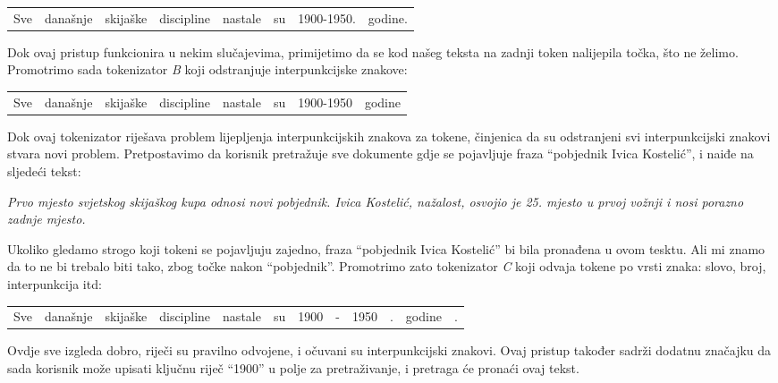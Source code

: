 \documentclass[a4paper,twoside,12pt]{scrreprt}
\newenvironment{nscenter}
 {\par\nopagebreak\centering}
 {\parskip=0pt\par\noindent\ignorespacesafterend}
\begin{document}
\begin{nscenter}
  \begin{tabular}{|c|c|c|c|c|c|c|c|}
    Sve & današnje & skijaške & discipline & nastale & su & 1900-1950. & godine.
  \end{tabular}
\end{nscenter}

Dok ovaj pristup funkcionira u nekim slučajevima, primijetimo da se kod našeg teksta na zadnji token nalijepila točka, što ne želimo. Promotrimo sada tokenizator \textit{B} koji odstranjuje interpunkcijske znakove:

\begin{nscenter}
  \begin{tabular}{|c|c|c|c|c|c|c|c|}
    Sve & današnje & skijaške & discipline & nastale & su & 1900-1950 & godine
  \end{tabular}
\end{nscenter}

Dok ovaj tokenizator riješava problem lijepljenja interpunkcijskih znakova za tokene, činjenica da su odstranjeni svi interpunkcijski znakovi stvara novi problem. Pretpostavimo da korisnik pretražuje sve dokumente gdje se pojavljuje fraza ``pobjednik Ivica Kostelić'', i naiđe na sljedeći tekst:

\begin{quoting}
  \textit{Prvo mjesto svjetskog skijaškog kupa odnosi novi pobjednik. Ivica Kostelić, nažalost, osvojio je 25. mjesto u prvoj vožnji i nosi porazno zadnje mjesto.}
\end{quoting}

Ukoliko gledamo strogo koji tokeni se pojavljuju zajedno, fraza ``pobjednik Ivica Kostelić'' bi bila pronađena u ovom tesktu. Ali mi znamo da to ne bi trebalo biti tako, zbog točke nakon ``pobjednik''. Promotrimo zato tokenizator \textit{C} koji odvaja tokene po vrsti znaka: slovo, broj, interpunkcija itd:

\begin{nscenter}
  \begin{tabular}{|c|c|c|c|c|c|c|c|c|c|c|c|}
    Sve & današnje & skijaške & discipline & nastale & su & 1900 & - & 1950 & . & godine & .
  \end{tabular}
\end{nscenter}

Ovdje sve izgleda dobro, riječi su pravilno odvojene, i očuvani su interpunkcijski znakovi. Ovaj pristup također sadrži dodatnu značajku da sada korisnik može upisati ključnu riječ ``1900'' u polje za pretraživanje, i pretraga će pronaći ovaj tekst.
\end{document}

